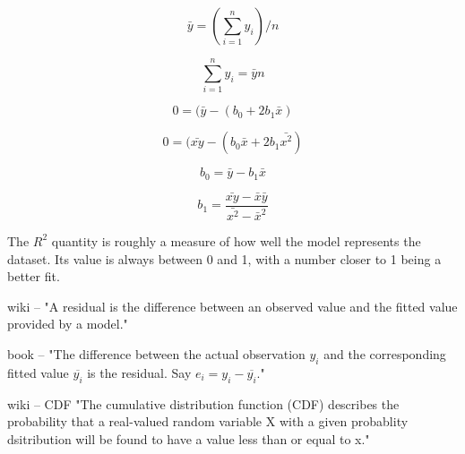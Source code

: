 \begin{equation}
\bar{y} = (\sum_{i=1}^{n} y_i) / n
\end{equation}

\begin{equation}
\sum_{i=1}^{n} y_i  = \bar{y}n
\end{equation}

\begin{equation}
0 = (\bar{y} - (b_0 + 2b_1 \bar{x})
\end{equation}

\begin{equation}
0 = (\bar{xy} - (b_0 \bar{x} + 2b_1 \bar{x^2})
\end{equation}

\begin{equation}
b_0 = \bar{y} - b_1 \bar{x}
\end{equation}

\begin{equation}
b_1 = \frac{\bar{xy} - \bar{x}\bar{y}}{\bar{x^2} - \bar{x}^2}
\end{equation}




The $R^2$ quantity is roughly a measure of how well the model represents the dataset. Its value is always between 0 and 1, with a number closer to 1 being a better fit. 

wiki -- "A residual is the difference between an observed value and the fitted value provided by a model."

book -- "The difference between the actual observation $y_i$ and the corresponding fitted value $\overline{y_i}$ is the residual. Say $e_i = y_i - \overline{y_i}$."

wiki -- CDF "The cumulative distribution function (CDF) describes the probability that a real-valued random variable X with a given probablity dsitribution will be found to have a value less than or equal to x."
